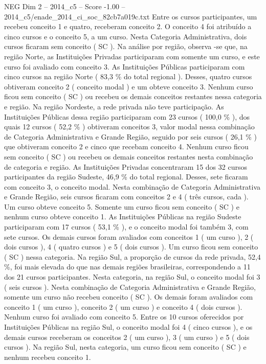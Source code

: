 \begin{textsample}{NEG Dim 2 – 2014\_c5 – Score -1.00 – 2014\_c5/enade\_2014\_ci\_soc\_82cb7a019c.txt}
Entre os cursos participantes, um recebeu conceito 1 e quatro, receberam conceito 2.
O conceito 4 foi atribuído a cinco cursos e o conceito 5, a um curso.
Nesta Categoria Administrativa, dois cursos ficaram sem conceito ( SC ).
Na análise por região, observa -se que, na região Norte, as Instituições Privadas participaram com somente um curso, e este curso foi avaliado com conceito 3.
As Instituições Públicas participaram com cinco cursos na região Norte ( 83,3 \% do total regional ).
Desses, quatro cursos obtiveram conceito 2 ( conceito modal ) e um obteve conceito 3.
Nenhum curso ficou sem conceito ( SC ) ou recebeu os demais conceitos restantes nessa categoria e região.
Na região Nordeste, a rede privada não teve participação.
As Instituições Públicas dessa região participaram com 23 cursos ( 100,0 \% ), dos quais 12 cursos ( 52,2 \% ) obtiveram conceitos 3, valor modal nessa combinação de Categoria Administrativa e Grande Região, seguido por seis cursos ( 26,1 \% ) que obtiveram conceito 2 e cinco que recebam conceito 4.
Nenhum curso ficou sem conceito ( SC ) ou recebeu os demais conceitos restantes nesta combinação de categoria e região.
As Instituições Privadas concentraram 15 dos 32 cursos participantes da região Sudeste, 46,9 \% do total regional.
Desses, sete ficaram com conceito 3, o conceito modal.
Nesta combinação de Categoria Administrativa e Grande Região, seis cursos ficaram com conceitos 2 e 4 ( três cursos, cada ).
Um curso obteve conceito 5.
Somente um curso ficou sem conceito ( SC ) e nenhum curso obteve conceito 1.
As Instituições Públicas na região Sudeste participaram com 17 cursos ( 53,1 \% ), e o conceito modal foi também 3, com sete cursos.
Os demais cursos foram avaliados com conceitos 1 ( um curso ), 2 ( dois cursos ), 4 ( quatro cursos ) e 5 ( dois cursos ).
Um curso ficou sem conceito ( SC ) nessa categoria.
Na região Sul, a proporção de cursos da rede privada, 52,4 \%, foi mais elevada do que nas demais regiões brasileiras, correspondendo a 11 dos 21 cursos participantes.
Nesta categoria, na região Sul, o conceito modal foi 3 ( seis cursos ).
Nesta combinação de Categoria Administrativa e Grande Região, somente um curso não recebeu conceito ( SC ).
Os demais foram avaliados com conceito 1 ( um curso ), conceito 2 ( um curso ) e conceito 4 ( dois cursos ).
Nenhum curso foi avaliado com conceito 5.
Entre os 10 cursos oferecidos por Instituições Públicas na região Sul, o conceito modal foi 4 ( cinco cursos ), e os demais cursos receberam os conceitos 2 ( um curso ), 3 ( um curso ) e 5 ( dois cursos ).
Na região Sul, nesta categoria, um curso ficou sem conceito ( SC ) e nenhum recebeu conceito 1.

\end{textsample}
